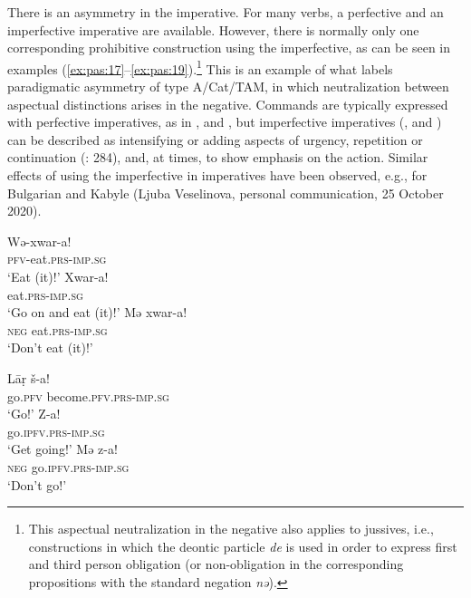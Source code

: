 \documentclass[output=paper,colorlinks,citecolor=brown]{langscibook}
\begin{document}
There is an asymmetry in the imperative. For many verbs, a perfective and an imperfective imperative are available. However, there is normally only one corresponding prohibitive construction using the imperfective, as can be seen in examples (\ref{ex:pas:17}--\ref{ex:pas:19}).\footnote{This aspectual neutralization in the negative also applies to jussives, i.e., constructions in which the deontic particle \textit{de} is used in order to express first and third person obligation (or non-obligation in the corresponding propositions with the standard negation \textit{nə}).}  This is an example of what \citet[114]{Miestamo2005} labels paradigmatic asymmetry of type A/Cat/TAM, in which neutralization between aspectual distinctions arises in the negative. Commands are typically expressed with perfective imperatives, as in ,  and , but imperfective imperatives (,  and ) can be described as intensifying or adding aspects of urgency, repetition or continuation (\citealt{DavidGoodman2014}: 284), and, at times, to show emphasis on the action. Similar effects of using the imperfective in imperatives have been observed, e.g., for Bulgarian and Kabyle (Ljuba Veselinova, personal communication, 25 October 2020).

\ea\label{ex:pas:17}
    \ea\label{ex:pas:17a}
        \gll Wə-xwar{}-a!\\
             \textsc{pfv}{}-eat.\textsc{prs}{}-\textsc{imp.sg}\\
        \glt ‘Eat (it)!’
    \ex\label{ex:pas:17b}
        \gll Xwar-a!\\
             eat.\textsc{prs}{}-\textsc{imp.sg}\\
        \glt ‘Go on and eat (it)!’
    \ex\label{ex:pas:17c}
        \gll Mə xwar-a!\\
             \textsc{neg} eat.\textsc{prs}{}-\textsc{imp.sg}\\
        \glt ‘Don’t eat (it)!’
    \z
\z 

\ea\label{ex:pas:18}
    \ea\label{ex:pas:18a}
        \gll Lāṛ š{}-a!\\
             go.\textsc{pfv} become\textsc{.pfv.prs{}-imp.sg}\\
        \glt ‘Go!’
    \ex\label{ex:pas:18b}
        \gll Z-a!\\
             go.\textsc{ipfv.prs-imp.sg}\\
        \glt ‘Get going!’
    \ex\label{ex:pas:18c}
        \gll Mə z-a!\\
        \textsc{neg} go.\textsc{ipfv.prs}{}-\textsc{imp.sg}\\
        \glt ‘Don’t go!’
    \z
\z 
\end{document}

